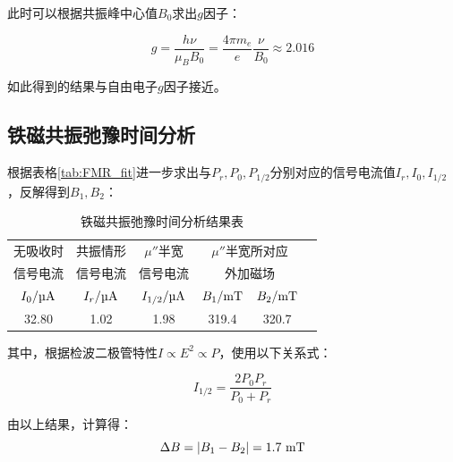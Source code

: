 \documentclass{thuemp}
\begin{document}
    此时可以根据共振峰中心值$B_0$求出$g$因子：
    
    \begin{equation}
    g = \frac{h \nu}{\mu_B B_0} = \frac{4\pi m_e}{e} \frac{\nu}{B_0}\approx 2.016
    \end{equation}
    
    如此得到的结果与自由电子$g$因子接近。
    
    \subsection{铁磁共振弛豫时间分析}
    
    根据表格\ref{tab:FMR_fit}进一步求出与$P_r, P_0, P_{1/2}$分别对应的信号电流值$I_r, I_0, I_{1/2}$，反解得到$B_{1}, B_{2}$：
    
    \begin{table}[H]
        \centering
        \captionnamefont{\wuhao\bf\heiti}
        \captiontitlefont{\wuhao\bf\heiti}
        \caption{铁磁共振弛豫时间分析结果表} \label{tab:FMR_relax}
        \liuhao
        \begin{tabular}{cccccc}
            \toprule
            无吸收时 & 共振情形 & $\mu''$半宽 &
                \multicolumn{2}{c}{$\mu''$半宽所对应}\\
            信号电流 & 信号电流 & 信号电流     &  
                \multicolumn{2}{c}{外加磁场}\\
            $I_{0}/\text{\si{\micro\ampere}}$ & 
                $I_{r}/\text{\si{\micro\ampere}}$ &
                $I_{1/2}/\text{\si{\micro\ampere}}$&
                $B_1/\text{\si{\milli\tesla}}$ &
                $B_2/\text{\si{\milli\tesla}}$ \\ 
            \midrule
            32.80& 1.02 & 1.98 & 319.4 & 320.7 \\
            \bottomrule
        \end{tabular}
    \end{table}
    
    其中，根据检波二极管特性$I \propto E^2 \propto P$，使用以下关系式：
    
    \begin{equation}
        I_{1/2} = \frac{2P_0P_r}{P_0+P_r}
    \end{equation}
    
    由以上结果，计算得：
    \begin{equation}
        \Delta B = |B_1 - B_2| = 1.7 ~\text{\si{\milli\tesla}}
    \end{equation}
    
\end{document}

